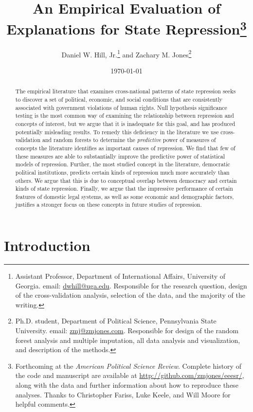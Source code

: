 \documentclass[11pt]{article}
\date{\today}
\title{An Empirical Evaluation of Explanations for State Repression\thanks{Forthcoming at the {\it American Political Science Review}. Complete history of the code and manuscript are available at \url{http://github.com/zmjones/eeesr/}, along with the data and further information about how to reproduce these analyses. Thanks to Christopher Fariss, Luke Keele, and Will Moore for helpful comments.}}
\author{Daniel W. Hill, Jr.\thanks{Assistant Professor, Department of International Affairs,
University of Georgia. email: \href{mailto:dwhill@uga.edu}{dwhill@uga.edu}. Responsible for the research question, design of the cross-validation analysis, selection of the data, and the majority of the writing.} and Zachary M. Jones\thanks{Ph.D. student, Department of Political Science, Pennsylvania State University. email: \href{mailto:zmj@zmjones.com}{zmj@zmjones.com}. Responsible for design of the random forest analysis and multiple imputation, all data analysis and visualization, and description of the methods.}}
\begin{document}
\maketitle 


\begin{abstract}
The empirical literature that examines cross-national patterns of state repression seeks to discover a set of political, economic, and social conditions that are consistently associated with government violations of human rights. Null hypothesis significance testing is the most common way of examining the relationship  between repression and concepts of interest, but we argue that it is inadequate for this goal, and has produced potentially misleading results. To remedy this deficiency in the literature we use cross-validation and random forests to determine the {\em predictive} power of measures of concepts the literature identifies as important causes of repression. We find that few of these measures are able to substantially improve the predictive power of statistical models of repression. Further, the most studied concept in the literature, democratic political institutions, predicts certain kinds of repression much more accurately than others. We argue that this is due to conceptual overlap between democracy and certain kinds of state repression. Finally, we argue that the impressive performance of certain features of domestic legal systems, as well as some economic and demographic factors, justifies a stronger focus on these concepts in future studies of repression.
\end{abstract}

\clearpage
\setcounter{page}{1}

\section{Introduction}
\end{document}
